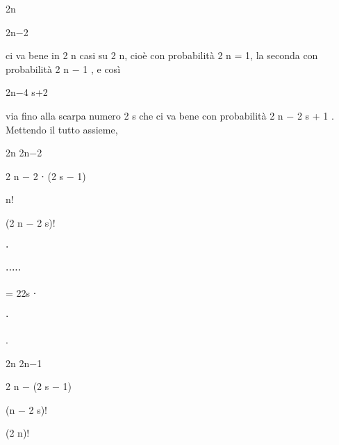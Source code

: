 \documentclass[a4paper,portrait,12pt]{article}
\begin{document}
\begin{flushleft}
2n
\end{flushleft}


\begin{flushleft}
2n$-$2
\end{flushleft}


\begin{flushleft}
ci va bene in 2 n casi su 2 n, cio\`{e} con probabilit\`{a} 2 n = 1, la seconda con probabilit\`{a} 2 n $-$ 1 , e così
\end{flushleft}


\begin{flushleft}
2n$-$4 s+2
\end{flushleft}


\begin{flushleft}
via fino alla scarpa numero 2 s che ci va bene con probabilit\`{a} 2 n $-$ 2 s + 1 . Mettendo il tutto assieme,
\end{flushleft}


\begin{flushleft}
2n 2n$-$2
\end{flushleft}


\begin{flushleft}
2 n $-$ 2 ⋅ (2 s $-$ 1)
\end{flushleft}


\begin{flushleft}
n!
\end{flushleft}


\begin{flushleft}
(2 n $-$ 2 s)!
\end{flushleft}


⋅


⋅⋅⋅⋅⋅


\begin{flushleft}
= 22s ⋅
\end{flushleft}


⋅


.


\begin{flushleft}
2n 2n$-$1
\end{flushleft}


\begin{flushleft}
2 n $-$ (2 s $-$ 1)
\end{flushleft}


\begin{flushleft}
(n $-$ 2 s)!
\end{flushleft}


\begin{flushleft}
(2 n)!
\end{flushleft}
\end{document}
